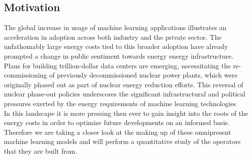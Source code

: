 \documentclass[conference]{IEEEtran}
\begin{document}
\subsection{Motivation}
The global increase in usage of machine learning applications illustrates an acceleration in adoption across both industry and the private sector. The unfathomably large energy costs tied to this broader adoption have already prompted a change in public sentiment towards energy energy infrastructure.  Plans for building trillion-dollar data centers are emerging, necessitating the re-commissioning of previously decommissioned nuclear power plants, which were originally phased out as part of nuclear energy reduction efforts. This reversal of nuclear phase-out policies underscores the significant infrastructural and political pressures exerted by the energy requirements of machine learning technologies\\
In this landscape it is more pressing then ever to gain insight into the roots of the energy costs in order to optimize future developments on an informed basis. Therefore we are taking a closer look at the making up of these omnipresent machine learning models and will perform a quantitative study of the operators that they are built from.
\end{document}
